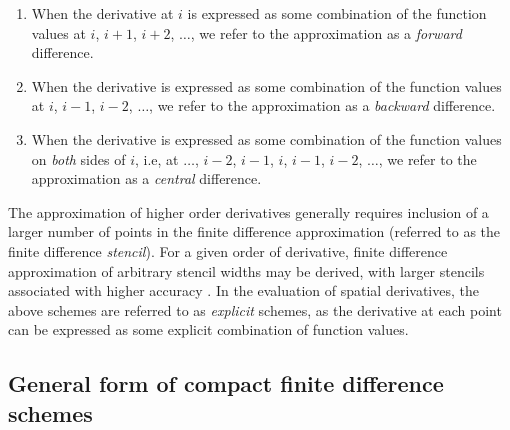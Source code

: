 \begin{enumerate}
    \item When the derivative at $i$ is expressed
        as some combination of the function values
        at $i$, $i+1$, $i+2$, $\hdots$,
        we refer to the approximation as a
        \emph{forward} difference.
        
    \item When the derivative is expressed as
        some combination of the function values
        at $i$, $i-1$, $i-2$, $\hdots$,
        we refer to the approximation as a
        \emph{backward} difference.

    \item When the derivative is expressed as
        some combination of the function values
        on \emph{both} sides of $i$, i.e,
        at $\hdots$, $i-2$, $i-1$, $i$, $i-1$, $i-2$, $\hdots$,
        we refer to the approximation as a
        \emph{central} difference.
\end{enumerate}
%
The approximation of higher order derivatives generally requires
inclusion of a larger number of points in the
finite difference approximation
(referred to as the finite difference \emph{stencil}).
For a given order of derivative,
finite difference approximation of arbitrary stencil widths
may be derived,
with larger stencils associated with higher accuracy \cite{fornberg1988generation}.
In the evaluation of spatial derivatives,
the above schemes are referred to as \emph{explicit}
schemes, as the derivative at each point
can be expressed as some explicit combination of function values.

\subsection{General form of compact finite difference schemes}
\label{subsec:gen-form-compact}

